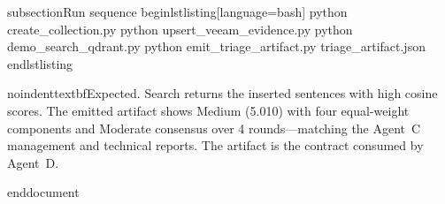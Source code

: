 subsection{Run sequence}
begin{lstlisting}[language=bash]
python create_collection.py
python upsert_veeam_evidence.py
python demo_search_qdrant.py
python emit_triage_artifact.py  triage_artifact.json
end{lstlisting}

noindenttextbf{Expected.} Search returns the inserted sentences with high cosine scores. The emitted artifact shows Medium (5.010) with four equal-weight components and Moderate consensus over 4 rounds—matching the Agent~C management and technical reports. The artifact is the contract consumed by Agent~D.

end{document}
